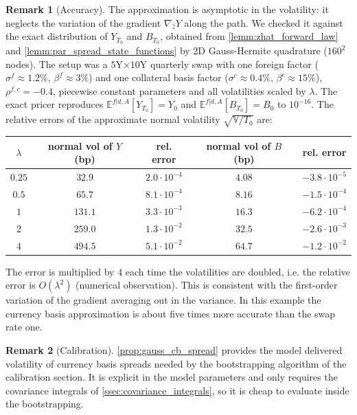 \documentclass[11pt,english]{amsart}
\newcommand{\EE}{\mathbb{E}}
\newcommand{\VV}{\mathbb{V}}
\theoremstyle{definition}
\newtheorem{rema}{Remark}
\begin{document}
\begin{rema}[Accuracy]
The approximation is asymptotic in the volatility: it neglects the variation of the gradient $\nabla_{\hat{z}}Y$ along the path. We checked it against the exact distribution of $Y_{T_0}$ and $B_{T_0}$, obtained from \autoref{lemm:zhat_forward_law} and \autoref{lemm:par_spread_state_functions} by 2D Gauss-Hermite quadrature ($160^2$ nodes). The setup was a $5$Y$\times10$Y quarterly swap with one foreign factor ($\sigma^f \approx 1.2\%$, $\beta^f\approx 3\%$) and one collateral basis factor ($\sigma^c\approx 0.4\%$, $\beta^c \approx 15\%$), $\rho^{f,c} = -0.4$, piecewise constant parameters and all volatilities scaled by $\lambda$. The exact pricer reproduces $\EE^{f|d,A}[Y_{T_0}] = Y_0$ and $\EE^{f|d,A}[B_{T_0}] = B_0$ to $10^{-16}$. The relative errors of the approximate normal volatility $\sqrt{\VV/T_0}$ are:
\begin{center}
\begin{tabular}{|c|c|c|c|c|}
\hline
$\lambda$ & normal vol of $Y$ (bp) & rel. error & normal vol of $B$ (bp) & rel. error \\
\hline
$0.25$ & $32.9$  & $2.0\cdot 10^{-4}$ & $4.08$ & $-3.8\cdot 10^{-5}$ \\
$0.5$  & $65.7$  & $8.1\cdot 10^{-4}$ & $8.16$ & $-1.5\cdot 10^{-4}$ \\
$1$    & $131.1$ & $3.3\cdot 10^{-3}$ & $16.3$ & $-6.2\cdot 10^{-4}$ \\
$2$    & $259.0$ & $1.3\cdot 10^{-2}$ & $32.5$ & $-2.6\cdot 10^{-3}$ \\
$4$    & $494.5$ & $5.1\cdot 10^{-2}$ & $64.7$ & $-1.2\cdot 10^{-2}$ \\
\hline
\end{tabular}
\end{center}
The error is multiplied by $4$ each time the volatilities are doubled, i.e. the relative error is $O(\lambda^2)$ (numerical observation). This is consistent with the first-order variation of the gradient averaging out in the variance. In this example the currency basis approximation is about five times more accurate than the swap rate one.
\end{rema}

\begin{rema}[Calibration]
\autoref{prop:gauss_cb_spread} provides the model delivered volatility of currency basis spreads needed by the bootstrapping algorithm of the calibration section. It is explicit in the model parameters and only requires the covariance integrals of \autoref{ssec:covariance_integrals}, so it is cheap to evaluate inside the bootstrapping.
\end{rema}
\end{document}
